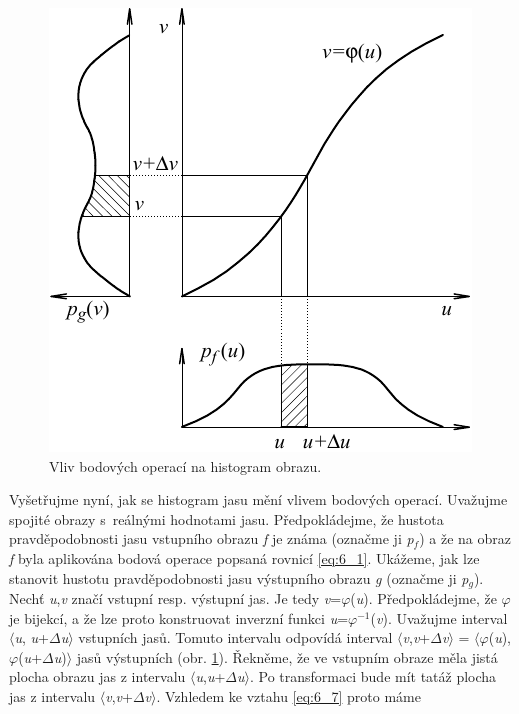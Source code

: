 \begin{figure}[th]
    \begin{center}
        \includegraphics[scale=1.0]{06_bodoveoperace/images/img_6_2.pdf}
    \end{center}
    \caption{Vliv bodových operací na histogram obrazu.}
    \label{img:6_2}
\end{figure}

Vyšetřujme nyní, jak se histogram jasu mění vlivem bodových operací. Uvažujme spojité obrazy s~reálnými hodnotami jasu. Předpokládejme, že hustota pravděpodobnosti jasu vstupního obrazu \textit{f} je známa (označme ji \textit{p}$_f$) a že na obraz \textit{f} byla aplikována bodová operace popsaná rovnicí \eqref{eq:6_1}. Ukážeme, jak lze stanovit hustotu pravděpodobnosti jasu výstupního obrazu \textit{g} (označme ji \textit{p}$_g$). Nechť \textit{u},\textit{v} značí vstupní resp. výstupní jas. Je tedy \textit{v}=$\varphi$(\textit{u}). Předpokládejme, že $\varphi$ je bijekcí, a že lze proto konstruovat inverzní funkci \textit{u}=$\varphi^{-1}$(\textit{v}). Uvažujme interval $\langle$\textit{u}, \textit{u}+$\Delta$\textit{u}$\rangle$ vstupních jasů. Tomuto intervalu odpovídá interval $\langle$\textit{v},\textit{v}+$\Delta$\textit{v}$\rangle$ = $\langle$$\varphi$(\textit{u}), $\varphi$(\textit{u}+$\Delta$\textit{u})$\rangle$ jasů výstupních (obr. \ref{img:6_2}). Řekněme, že ve vstupním obraze měla jistá plocha obrazu jas z intervalu $\langle$\textit{u},\textit{u}+$\Delta$\textit{u}$\rangle$. Po transformaci bude mít tatáž plocha  jas z intervalu $\langle$\textit{v},\textit{v}+$\Delta$\textit{v}$\rangle$. Vzhledem ke vztahu \eqref{eq:6_7} proto máme 

